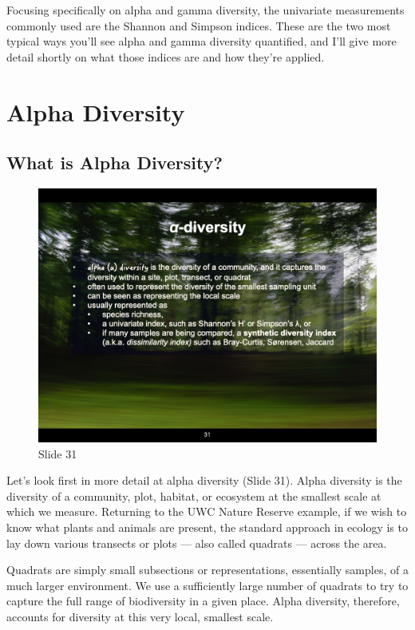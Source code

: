 \documentclass[
  11pt,
]{book}
\begin{document}
Focusing specifically on alpha and gamma diversity, the univariate
measurements commonly used are the Shannon and Simpson indices. These
are the two most typical ways you'll see alpha and gamma diversity
quantified, and I'll give more detail shortly on what those indices are
and how they're applied.

\section{Alpha Diversity}\label{alpha-diversity}

\subsection{What is Alpha Diversity?}\label{what-is-alpha-diversity}

\begin{figure}[ht]
\centering
\includegraphics[width=0.8\linewidth]{../images/BDC334/BDC334-031.jpeg}
\caption*{Slide 31}
\end{figure}

Let's look first in more detail at alpha diversity (Slide 31). Alpha
diversity is the diversity of a community, plot, habitat, or ecosystem
at the smallest scale at which we measure. Returning to the UWC Nature
Reserve example, if we wish to know what plants and animals are present,
the standard approach in ecology is to lay down various transects or
plots --- also called quadrats --- across the area.

Quadrats are simply small subsections or representations, essentially
samples, of a much larger environment. We use a sufficiently large
number of quadrats to try to capture the full range of biodiversity in a
given place. Alpha diversity, therefore, accounts for diversity at this
very local, smallest scale.
\end{document}
